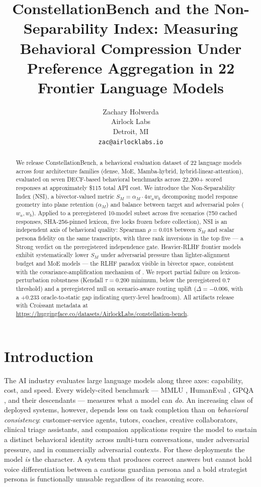 \documentclass{article}
\title{ConstellationBench and the Non-Separability Index: Measuring Behavioral Compression Under Preference Aggregation in 22 Frontier Language Models}
\author{%
  Zachary Holwerda \\
  Airlock Labs \\
  Detroit, MI \\
  \texttt{zac@airlocklabs.io} \\
}
\begin{document}
\maketitle

\begin{abstract}
We release ConstellationBench, a behavioral evaluation dataset of 22 language models across four architecture families (dense, MoE, Mamba-hybrid, hybrid-linear-attention), evaluated on seven DECF-based behavioral benchmarks across 22{,}200+ scored responses at approximately \$115 total API cost. We introduce the Non-Separability Index (NSI), a bivector-valued metric $S_M = \alpha_M \cdot 4 w_a w_b$ decomposing model response geometry into plane retention ($\alpha_M$) and balance between target and adversarial poles ($w_a, w_b$). Applied to a preregistered 10-model subset across five scenarios (750 cached responses, SHA-256-pinned lexicon, five locks frozen before collection), NSI is an independent axis of behavioral quality: Spearman $\rho = 0.018$ between $S_M$ and scalar persona fidelity on the same transcripts, with three rank inversions in the top five --- a Strong verdict on the preregistered independence gate. Heavier-RLHF frontier models exhibit systematically lower $S_M$ under adversarial pressure than lighter-alignment budget and MoE models --- the RLHF paradox visible in bivector space, consistent with the covariance-amplification mechanism of \citet{shapira2026rlhf}. We report partial failure on lexicon-perturbation robustness (Kendall $\tau = 0.200$ minimum, below the preregistered $0.7$ threshold) and a preregistered null on scenario-aware routing uplift ($\Delta = -0.006$, with a $+0.233$ oracle-to-static gap indicating query-level headroom). All artifacts release with Croissant metadata at \url{https://huggingface.co/datasets/AirlockLabs/constellation-bench}.
\end{abstract}

\section{Introduction}
\label{sec:intro}

The AI industry evaluates large language models along three axes: capability, cost, and speed. Every widely-cited benchmark --- MMLU \citep{hendrycks2021measuring}, HumanEval \citep{chen2021evaluating}, GPQA \citep{rein2023gpqa}, and their descendants --- measures what a model can \emph{do}. An increasing class of deployed systems, however, depends less on task completion than on \emph{behavioral consistency}: customer-service agents, tutors, coaches, creative collaborators, clinical triage assistants, and companion applications require the model to sustain a distinct behavioral identity across multi-turn conversations, under adversarial pressure, and in commercially adversarial contexts. For these deployments the model \emph{is} the character. A system that produces correct answers but cannot hold voice differentiation between a cautious guardian persona and a bold strategist persona is functionally unusable regardless of its reasoning score.
\end{document}
